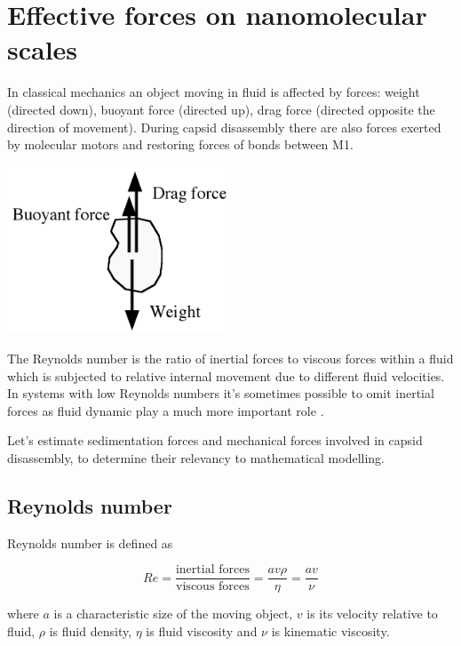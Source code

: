 \section{Effective forces on nanomolecular scales}
\label{appendix:nanomolecular}

In classical mechanics an object moving in fluid is affected by forces: weight (directed down), buoyant force (directed up), drag force (directed opposite the direction of movement). During capsid disassembly there are also forces exerted by molecular motors and restoring forces of bonds between M1.

\begin{center}
\includegraphics[width=0.5\textwidth]{D_chapters/1_TugOfWar/Sedimentation.PNG}
\end{center}

The Reynolds number is the ratio of inertial forces to viscous forces within a fluid which is subjected to relative internal movement due to different fluid velocities. In systems with low Reynolds numbers it's sometimes possible to omit inertial forces as fluid dynamic play a much more important role \cite{purcell1977life}.

Let's estimate sedimentation forces and mechanical forces involved in capsid disassembly, to determine their relevancy to mathematical modelling.

\subsection{Reynolds number}

Reynolds number is defined as

\begin{equation}
Re = \frac{\text{inertial forces}}{\text{viscous forces}} =\frac{av\rho}{\eta} = \frac{av}{\nu}
\end{equation}

where $a$ is a characteristic size of the moving object, $v$ is its velocity relative to fluid, $\rho$ is fluid density, $\eta$ is fluid viscosity and $\nu$ is kinematic viscosity.

